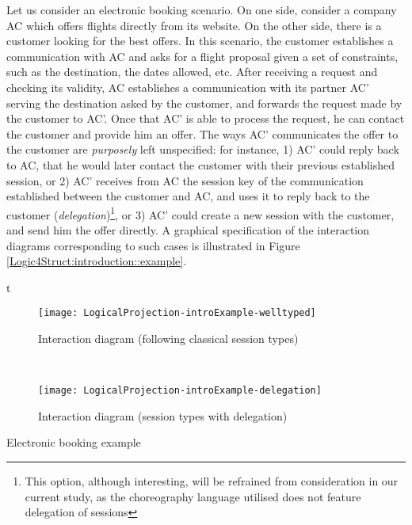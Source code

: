 Let us consider an electronic booking scenario.  On one side, consider
a company AC which offers flights directly from its website. On the
other side, there is a customer looking for the best offers.  In this
scenario, the customer establishes a communication with AC and asks
for a flight proposal given a set of constraints, such as the
destination, the dates allowed, etc. After receiving a request and
checking its validity, AC establishes a communication with its partner
AC' serving the destination asked by the customer, and forwards the
request made by the customer to AC'. Once that AC' is able to process
the request, he can contact the customer and provide him an offer. The
ways AC' communicates the offer to  the customer are \emph{purposely} left unspecified:
for instance, 1) AC' could reply back to AC, that he would later contact
the customer with their previous established session, or 2) AC' receives from AC the session key of the
communication established between the customer and AC, and uses it to
reply back to the customer (\emph{delegation})\footnote{This option,
  although interesting, will be refrained from consideration in our
  current study, as the choreography language utilised does not
  feature delegation of sessions}, or 3) AC' could
create a new session with the customer, and send him the offer
directly. A graphical specification of the
interaction diagrams corresponding to such cases is illustrated  in Figure
\ref{Logic4Struct:introduction::example}.


\begin{myfigure}{t} \vspace{1cm}
     \centering
     \begin{subfigure}[b]{0.65\textwidth}
       \centering
       \texttt{[image: LogicalProjection-introExample-welltyped]}
       \caption{Interaction diagram (following classical session types)}
     \end{subfigure} \\
     \begin{subfigure}[b]{0.65\textwidth}
       \texttt{[image: LogicalProjection-introExample-delegation]}
       \caption{Interaction diagram (session types with delegation)}
       \centering
     \end{subfigure} 
    \caption{Electronic booking example}
    \label{Logic4Struct:introduction::example}
\end{myfigure}



